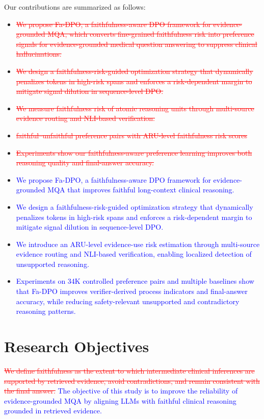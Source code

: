 \documentclass[a4paper,fleqn,doubleblind]{cas-sc}
\DeclareRobustCommand{\deleted}[1]{\textcolor{red}{\sout{#1}}}
\DeclareRobustCommand{\added}[1]{\textcolor{blue}{#1}}
\begin{document}
Our contributions are summarized as follows:
\begin{itemize}[noitemsep]
\item \deleted{We propose Fa-DPO, a faithfulness-aware DPO framework for evidence-grounded MQA, which converts fine-grained faithfulness risk into preference signals for evidence-grounded medical question answering to suppress clinical hallucinations.}
\item \deleted{We design a faithfulness-risk-guided optimization strategy that dynamically penalizes tokens in high-risk spans and enforces a risk-dependent margin to mitigate signal dilution in sequence-level DPO.}
\item \deleted{We measure faithfulness risk of atomic reasoning units through multi-source evidence routing and NLI-based verification.}
\item \deleted{faithful--unfaithful preference pairs with ARU-level faithfulness risk scores}
\item \deleted{Experiments show our faithfulness-aware preference learning improves both reasoning quality and final-answer accuracy.}
\item \added{We propose Fa-DPO, a faithfulness-aware DPO framework for evidence-grounded MQA that improves faithful long-context clinical reasoning.}
\item \added{We design a faithfulness-risk-guided optimization strategy that dynamically penalizes tokens in high-risk spans and enforces a risk-dependent margin to mitigate signal dilution in sequence-level DPO.}
\item \added{We introduce an ARU-level evidence-use risk estimation through multi-source evidence routing and NLI-based verification, enabling localized detection of unsupported reasoning.}
\item \added{Experiments on 34K controlled preference pairs and multiple baselines show that Fa-DPO improves verifier-derived process indicators and final-answer accuracy, while reducing safety-relevant unsupported and contradictory reasoning patterns.}
\end{itemize}


\section{Research Objectives}
\label{sec:research_objectives}

\deleted{We define faithfulness as the extent to which intermediate clinical inferences are supported by retrieved evidence, avoid contradictions, and remain consistent with the final answer.}
\added{The objective of this study is to improve the reliability of evidence-grounded MQA by aligning LLMs with faithful clinical reasoning grounded in retrieved evidence.}
\end{document}
